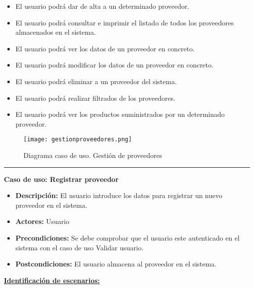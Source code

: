 \begin{itemize}
 \item El usuario podrá dar de alta a un determinado proveedor. 
 \item El usuario podrá consultar e imprimir el listado de todos los proveedores almacenados en el sistema.
 \item El usuario podrá ver los datos de un proveedor en concreto.
 \item El usuario podrá modificar los datos de un proveedor en concreto.
 \item El usuario podrá eliminar a un proveedor del sistema.
 \item El usuario podrá realizar filtrados de los proveedores.
\item El usuario podrá ver los productos suministrados por un determinado proveedor.
\end{itemize}
\begin{figure}[H]
  \centering
    \texttt{[image: gestionproveedores.png]}
  \caption{Diagrama caso de uso. Gestión de proveedores}
  \label{cu3}
\end{figure}
\smallskip
\hrule height 1pt
\smallskip
\textbf{Caso de uso: Registrar proveedor}
\begin{itemize}\renewcommand{\labelitemi}{$\cdot$}
 \item \textbf{Descripción:} El usuario introduce los datos para registrar un nuevo proveedor en el sistema.
  \item \textbf{Actores:} Usuario
  \item \textbf{Precondiciones:} Se debe comprobar que el usuario este autenticado en el sistema con el caso de uso Validar usuario.
  \item \textbf{Postcondiciones:} El usuario almacena al proveedor en el sistema.
\end{itemize}
\underline{\textbf{Identificación de escenarios:}}
